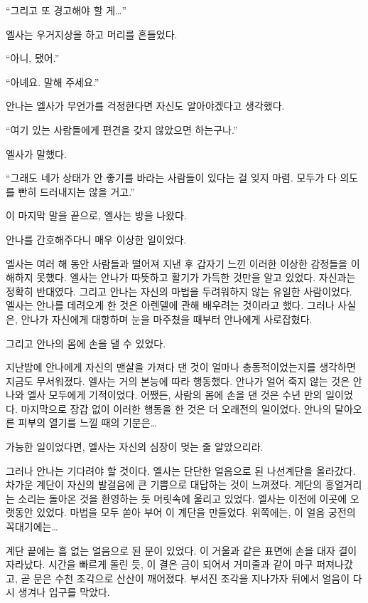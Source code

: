 ``그리고 또 경고해야 할 게\ldots''

엘사는 우거지상을 하고 머리를 흔들었다.

``아니, 됐어.''

``아녜요. 말해 주세요.''

안나는 엘사가 무언가를 걱정한다면 자신도 알아야겠다고 생각했다.

``여기 있는 사람들에게 편견을 갖지 않았으면 하는구나.''

엘사가 말했다.

``그래도 네가 상태가 안 좋기를 바라는 사람들이 있다는 걸 잊지 마렴. 모두가 다 의도를 빤히 드러내지는 않을 거고.''

이 마지막 말을 끝으로, 엘사는 방을 나왔다.

\textbreak

안나를 간호해주다니 매우 이상한 일이었다.

엘사는 여러 해 동안 사람들과 떨어져 지낸 후 갑자기 느낀 이러한 이상한 감정들을 이해하지 못했다. 엘사는 안나가 따뜻하고 활기가 가득한 것만을 알고 있었다. 자신과는 정확히 반대였다. 그리고 안나는 자신의 마법을 두려워하지 않는 유일한 사람이었다. 엘사는 안나를 데려오게 한 것은 아렌델에 관해 배우려는 것이라고 했다. 그러나 사실은, 안나가 자신에게 대항하며 눈을 마주쳤을 때부터 안나에게 사로잡혔다.

그리고 안나의 몸에 손을 댈 수 있었다.

지난밤에 안나에게 자신의 맨살을 가져다 댄 것이 얼마나 충동적이었는지를 생각하면 지금도 무서워졌다. 엘사는 거의 본능에 따라 행동했다. 안나가 얼어 죽지 않는 것은 안나와 엘사 모두에게 기적이었다. 어쨌든, 사람의 몸에 손을 댄 것은 수년 만의 일이었다. 마지막으로 장갑 없이 이러한 행동을 한 것은 더 오래전의 일이었다. 안나의 달아오른 피부의 열기를 느낄 때의 기분은\ldots

가능한 일이었다면, 엘사는 자신의 심장이 멎는 줄 알았으리라.

그러나 안나는 기다려야 할 것이다. 엘사는 단단한 얼음으로 된 나선계단을 올라갔다. 차가운 계단이 자신의 발걸음에 큰 기쁨으로 대답하는 것이 느껴졌다. 계단의 흥얼거리는 소리는 돌아온 것을 환영하는 듯 머릿속에 울리고 있었다. 엘사는 이전에 이곳에 오랫동안 있었다. 마법을 모두 쏟아 부어 이 계단을 만들었다. 위쪽에는, 이 얼음 궁전의 꼭대기에는\ldots

계단 끝에는 흠 없는 얼음으로 된 문이 있었다. 이 거울과 같은 표면에 손을 대자 결이 자라났다. 시간을 빠르게 돌린 듯, 이 결은 금이 되어서 거미줄과 같이 마구 퍼져나갔고, 곧 문은 수천 조각으로 산산이 깨어졌다. 부서진 조각을 지나가자 뒤에서 얼음이 다시 생겨나 입구를 막았다.

